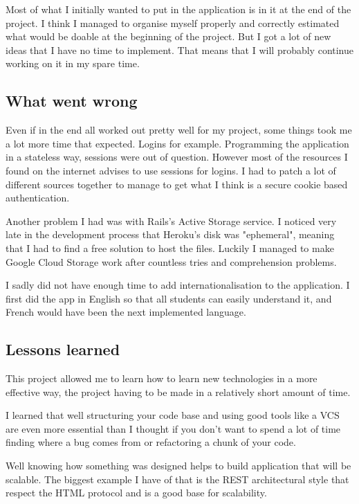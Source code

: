 \documentclass[12pt,a4paper]{article}
\begin{document}
Most of what I initially wanted to put in the application is in it at the end
of the project. I think I managed to organise myself properly and correctly
estimated what would be doable at the beginning of the project. But I got a lot
of new ideas that I have no time to implement. That means that I will probably
continue working on it in my spare time.

\subsection{What went wrong}

Even if in the end all worked out pretty well for my project, some things took me
a lot more time that expected. Logins for example. Programming the application
in a stateless way, sessions were out of question. However most of the
resources I found on the internet advises to use sessions for logins. I had to
patch a lot of different sources together to manage to get what I think is a
secure cookie based authentication.

Another problem I had was with Rails's Active Storage service. I noticed very
late in the development process that Heroku's disk was "ephemeral", meaning
that I had to find a free solution to host the files. Luckily I managed to make
Google Cloud Storage work after countless tries and comprehension problems.

I sadly did not have enough time to add internationalisation to the
application. I first did the app in English so that all students can easily
understand it, and French would have been the next implemented language.

\subsection{Lessons learned}

This project allowed me to learn how to learn new technologies in a more effective
way, the project having to be made in a relatively short amount of time.

I learned that well structuring your code base and using good tools like a VCS
are even more essential than I thought if you don't want to spend a lot of time
finding where a bug comes from or refactoring a chunk of your code.

Well knowing how something was designed helps to build application that will be
scalable. The biggest example I have of that is the REST architectural style
that respect the HTML protocol and is a good base for scalability.
\end{document}
